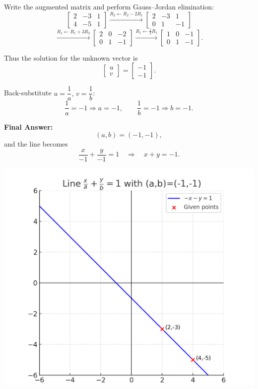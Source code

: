 \documentclass[journal]{IEEEtran}
\begin{document}
Write the augmented matrix and perform Gauss--Jordan elimination:
\begin{equation}
\left[\begin{array}{cc|c}
2 & -3 & 1\\[4pt]
4 & -5 & 1
\end{array}\right]
\overset{R_2\leftarrow R_2-2R_1}{\longrightarrow}
\left[\begin{array}{cc|c}
2 & -3 & 1\\[4pt]
0 & 1 & -1
\end{array}\right]
\end{equation}
\begin{equation}
\overset{R_1\leftarrow R_1+3R_2}{\longrightarrow}
\left[\begin{array}{cc|c}
2 & 0 & -2\\[4pt]
0 & 1 & -1
\end{array}\right]
\overset{R_1\leftarrow \tfrac{1}{2}R_1}{\longrightarrow}
\left[\begin{array}{cc|c}
1 & 0 & -1\\[4pt]
0 & 1 & -1
\end{array}\right].
\end{equation}

Thus the solution for the unknown vector is
\[
\begin{bmatrix} u\\ v\end{bmatrix}
=
\begin{bmatrix} -1\\ -1\end{bmatrix}.
\]

Back-substitute $u=\dfrac{1}{a},\, v=\dfrac{1}{b}$:
\begin{equation}
\frac{1}{a}=-1 \Rightarrow a=-1,\qquad
\frac{1}{b}=-1 \Rightarrow b=-1.
\end{equation}

\textbf{Final Answer:}
\begin{equation}
(a,b)=(-1,-1),
\end{equation}
and the line becomes
\[
\frac{x}{-1}+\frac{y}{-1}=1 \quad\Longrightarrow\quad x+y=-1.
\]

\begin{center}
    \includegraphics[width=0.8\columnwidth]{figs/plot6.png}
\end{center}
\end{document}
